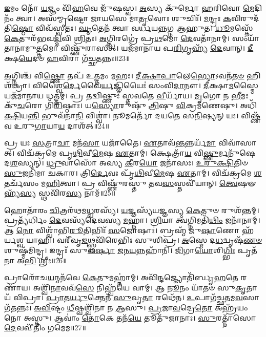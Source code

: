 \-\ul{𑌇}\-𑌮𑌂 𑌨𑍋᳴ \ul{𑌯}\-𑌜𑍍𑌞𑌂 𑌵𑌿᳴\-\ul{𑌹}\-𑌵𑍇 𑌜𑍁᳴𑌷𑌸𑍍𑌵।
\-\ul{𑌅}\-𑌸𑍍𑌯 𑌕𑍁᳴𑌰𑍍𑌮𑍋 𑌹𑌰𑌿𑌵𑍋 \ul{𑌮𑍇}\-𑌦𑌿𑌨𑌂᳴ 𑌤𑍍𑌵𑌾।
𑌅𑌸᳴𑌮𑍍𑌮𑍃𑌷𑍍𑌟𑍋 𑌜𑌾𑌯𑌸𑍇 𑌮𑌾\-\ul{𑌤𑍃}\-𑌵𑍋𑌃 𑌶𑍁𑌚𑌿𑌃᳴।
\-\ul{𑌮}\-𑌨𑍍𑌦𑍍𑌰𑌃 \ul{𑌕}\-𑌵𑌿𑌰𑍁𑌦᳴𑌤𑌿\-\ul{𑌷𑍍𑌠𑍋} 𑌵𑌿𑌵᳴𑌸𑍍𑌵𑌤𑌃।
\-\ul{𑌘𑍃}\-𑌤𑍇𑌨᳴ 𑌤𑍍𑌵𑌾 𑌵𑌰𑍍𑌧𑌯𑌨𑍍𑌨𑌗𑍍𑌨 𑌆𑌹𑍁𑌤।
\-\ul{𑌧𑍂}\-𑌮𑌸𑍍𑌤𑍇᳴ \ul{𑌕𑍇}\-𑌤𑍁𑌰᳴𑌭𑌵\-\ul{𑌦𑍍𑌦𑌿}\-𑌵𑌿 \ul{𑌶𑍍𑌰𑌿}\-𑌤𑌃।
\-\ul{𑌅}\-𑌗𑍍𑌨𑌿𑌰𑌗𑍍𑌰𑍇॑ 𑌪𑍍𑌰\-\ul{𑌥}\-𑌮𑍋 \ul{𑌦𑍇}\-𑌵𑌤𑌾᳴𑌨𑌾𑌮𑍍।
𑌸𑌂𑌯𑌾᳴𑌤𑌾𑌨𑌾𑌮𑍁\-\ul{𑌤𑍍𑌤}\-𑌮𑍋 𑌵𑌿𑌷𑍍𑌣𑍁᳴𑌰𑌾𑌸𑍀𑌤𑍍।
𑌯𑌜᳴𑌮𑌾𑌨𑌾𑌯 𑌪\-\ul{𑌰𑌿}\-𑌗𑍃𑌹𑍍𑌯᳴ \ul{𑌦𑍇}\-𑌵𑌾𑌨𑍍।
\-\ul{𑌦𑍀}\-𑌕𑍍𑌷\-\ul{𑌯𑍇}\-𑌦𑍞 \ul{𑌹}\-𑌵𑌿𑌰𑌾 𑌗᳴𑌚𑍍𑌛𑌤𑌨𑍍𑌨𑌃॥23॥

\-\ul{𑌅}\-𑌗𑍍𑌨𑌿𑌶𑍍𑌚᳴ 𑌵𑌿\-\ul{𑌷𑍍𑌣𑍋} 𑌤𑌪᳴ 𑌉\-\ul{𑌤𑍍𑌤}\-𑌮𑌂 \ul{𑌮}\-𑌹𑌃।
\-\ul{𑌦𑍀}\-\-\ul{𑌕𑍍𑌷𑌾}\-\-\ul{𑌪𑌾}\-𑌲𑍇\-\ul{𑌭𑍍𑌯𑍋}\-\-𑌽𑌵𑌨᳴\-\ul{𑌤}\-\-\ul{𑍞} 𑌹𑌿 𑌶᳴𑌕𑍍𑌰𑌾।
𑌵𑌿𑌶𑍍𑌵𑍈॑\-\ul{𑌰𑍍𑌦𑍇}\-𑌵𑍈\-\ul{𑌰𑍍𑌯}\-𑌜𑍍𑌞𑌿𑌯𑍈𑌃॑ 𑌸𑌂𑌵𑌿\-\ul{𑌦𑌾}\-𑌨𑍗।
\-\ul{𑌦𑍀}\-𑌕𑍍𑌷𑌾\-\ul{𑌮}\-𑌸𑍍𑌮𑍈 𑌯𑌜᳴𑌮𑌾𑌨𑌾𑌯 𑌧𑌤𑍍𑌤𑌮𑍍।
𑌪𑍍𑌰 𑌤𑌦𑍍𑌵𑌿𑌷𑍍𑌣𑍁𑌃᳴ 𑌸𑍍𑌤𑌵𑌤𑍇 \ul{𑌵𑍀}\-𑌰𑍍𑌯𑌾᳴𑌯।
\-\ul{𑌮𑍃}\-𑌗𑍋 𑌨 \ul{𑌭𑍀}\-𑌮𑌃 𑌕𑍁᳴\-\ul{𑌚}\-𑌰𑍋 𑌗𑌿᳴\-\ul{𑌰𑌿}\-𑌷𑍍𑌠𑌾𑌃।
𑌯\-\ul{𑌸𑍍𑌯𑍋}\-𑌰𑍁𑌷𑍁᳴ \ul{𑌤𑍍𑌰𑌿}\-𑌷𑍁 \ul{𑌵𑌿}\-𑌕𑍍𑌰𑌮᳴𑌣𑍇𑌷𑍁।
𑌅𑌧𑌿᳴ \ul{𑌕𑍍𑌷𑌿}\-𑌯\-\ul{𑌨𑍍𑌤𑌿} 𑌭𑍁𑌵᳴𑌨𑌾\-\ul{𑌨𑌿} 𑌵𑌿𑌶𑍍𑌵𑌾॑।
𑌨𑍂𑌮𑌰𑍍𑌤𑍋᳴ 𑌦𑌯𑌤𑍇 𑌸\-\ul{𑌨𑌿}\-𑌷𑍍𑌯𑌨𑍍 𑌯𑌃।
𑌵𑌿𑌷𑍍𑌣᳴𑌵 𑌉𑌰𑍁\-\ul{𑌗𑌾}\-𑌯𑌾\-\ul{𑌯} 𑌦𑌾𑌶᳴𑌤𑍍॥24॥

𑌪𑍍𑌰 𑌯𑌃 \ul{𑌸}\-𑌤𑍍𑌰𑌾\-\ul{𑌚𑌾} 𑌮𑌨᳴\-\ul{𑌸𑌾} 𑌯𑌜𑌾᳴𑌤𑍈।
\-\ul{𑌏}\-𑌤𑌾𑌵᳴\-\ul{𑌨𑍍𑌤}\-𑌨𑍍𑌨𑌰𑍍𑌯᳴\-\ul{𑌮𑌾} 𑌵𑌿𑌵𑌾᳴𑌸𑌾𑌤𑍍।
𑌵𑌿𑌚᳴𑌕𑍍𑌰𑌮𑍇 𑌪𑍃\-\ul{𑌥𑌿}\-𑌵𑍀\-\ul{𑌮𑍇}\-𑌷 \ul{𑌏}\-𑌤𑌾𑌮𑍍।
𑌕𑍍𑌷𑍇𑌤𑍍𑌰𑌾᳴\-\ul{𑌯} 𑌵𑌿\-\ul{𑌷𑍍𑌣𑍁}\-𑌰𑍍𑌮𑌨𑍁᳴𑌷𑍇 𑌦\-\ul{𑌶}\-𑌸𑍍𑌯𑌨𑍍।
\-\ul{𑌧𑍍𑌰𑍁}\-𑌵𑌾𑌸𑍋᳴ 𑌅𑌸𑍍𑌯 \ul{𑌕𑍀}\-𑌰\-\ul{𑌯𑍋} 𑌜𑌨𑌾᳴𑌸𑌃।
\-\ul{𑌉}\-\-\ul{𑌰𑍁}\-\-\ul{𑌕𑍍𑌷𑌿}\-𑌤𑌿𑍞 \ul{𑌸𑍁}\-𑌜𑌨𑌿᳴𑌮𑌾 𑌚𑌕𑌾𑌰।
𑌤𑍍𑌰𑌿\-\ul{𑌰𑍍𑌦𑍇}\-𑌵𑌃 𑌪𑍃᳴\-\ul{𑌥𑌿}\-𑌵𑍀\-\ul{𑌮𑍇}\-𑌷 \ul{𑌏}\-𑌤𑌾𑌮𑍍।
𑌵𑌿𑌚᳴𑌕𑍍𑌰𑌮𑍇 \ul{𑌶}\-𑌤𑌰𑍍𑌚᳴𑌸𑌂 𑌮\-\ul{𑌹𑌿}\-𑌤𑍍𑌵𑌾।
𑌪𑍍𑌰 𑌵𑌿𑌷𑍍𑌣𑍁᳴𑌰𑌸𑍍𑌤𑍁 \ul{𑌤}\-𑌵\-\ul{𑌸}\-𑌸𑍍𑌤𑌵𑍀᳴𑌯𑌾𑌨𑍍।
\-\ul{𑌤𑍍𑌵𑍇}\-𑌷𑍟 𑌹𑍍𑌯᳴\-\ul{𑌸𑍍𑌯} 𑌸𑍍𑌥𑌵𑌿᳴𑌰\-\ul{𑌸𑍍𑌯} 𑌨𑌾𑌮᳴॥25॥

𑌹𑍋𑌤𑌾᳴𑌰𑌂 \ul{𑌚𑌿}\-𑌤𑍍𑌰𑌰᳴𑌥𑌮\-\ul{𑌧𑍍𑌵}\-𑌰𑌸𑍍𑌯᳴।
\-\ul{𑌯}\-𑌜𑍍𑌞𑌸𑍍𑌯᳴𑌯𑌜𑍍𑌞𑌸𑍍𑌯 \ul{𑌕𑍇}\-𑌤𑍁𑍞 𑌰𑍁𑌶᳴𑌨𑍍𑌤𑌮𑍍।
𑌪𑍍𑌰𑌤𑍍𑌯᳴𑌰𑍍𑌧𑌿𑌂 \ul{𑌦𑍇}\-𑌵𑌸𑍍𑌯᳴𑌦𑍇𑌵𑌸𑍍𑌯 \ul{𑌮}\-𑌹𑍍𑌨𑌾।
\-\ul{𑌶𑍍𑌰𑌿}\-𑌯𑌾 𑌤𑍍𑌵᳴𑌗𑍍𑌨𑌿𑌮𑌤𑌿᳴\-\ul{𑌥𑌿𑌂} 𑌜𑌨𑌾᳴𑌨𑌾𑌮𑍍।
𑌆 \ul{𑌨𑍋} 𑌵𑌿𑌶𑍍𑌵𑌾᳴𑌭𑌿\-\ul{𑌰𑍂}\-𑌤𑌿𑌭𑌿𑌃᳴ \ul{𑌸}\-𑌜𑍋𑌷𑌾𑌃॑।
𑌬𑍍𑌰𑌹𑍍𑌮᳴ 𑌜𑍁\-\ul{𑌷𑌾}\-𑌣𑍋 𑌹᳴𑌰𑍍𑌯𑌶𑍍𑌵 𑌯𑌾𑌹𑌿।
𑌵𑌰𑍀᳴𑌵𑍃\-\ul{𑌜}\-𑌥𑍍𑌸𑍍𑌥𑌵𑌿᳴𑌰𑍇𑌭𑌿𑌃 𑌸𑍁𑌶𑌿𑌪𑍍𑌰।
\-\ul{𑌅}\-𑌸𑍍𑌮𑍇 𑌦\-\ul{𑌧}\-𑌦𑍍𑌵𑍃𑌷᳴\-\ul{𑌣}\-\-\ul{𑍞} 𑌶𑍁𑌷𑍍𑌮᳴𑌮𑌿𑌨𑍍𑌦𑍍𑌰।
𑌇𑌨𑍍𑌦𑍍𑌰𑌃᳴ 𑌸𑍁\-\ul{𑌵}\-\-\ul{𑌰𑍍}\-𑌷𑌾 \ul{𑌜}\-𑌨\-\ul{𑌯}\-𑌨𑍍𑌨𑌹𑌾᳴𑌨𑌿।
\-\ul{𑌜𑌿}\-𑌗𑌾\-\ul{𑌯𑍋}\-𑌶𑌿\-\ul{𑌗𑍍𑌭𑌿𑌃} 𑌪𑍃𑌤᳴𑌨𑌾 𑌅\-\ul{𑌭𑌿} 𑌶𑍍𑌰𑍀𑌃॥26॥

𑌪𑍍𑌰𑌾𑌰𑍋᳴𑌚\-\ul{𑌯}\-𑌨𑍍𑌮𑌨᳴𑌵𑍇 \ul{𑌕𑍇}\-𑌤𑍁𑌮𑌹𑍍𑌨𑌾॑𑌮𑍍।
𑌅𑌵𑌿᳴\-\ul{𑌨𑍍𑌦}\-𑌜𑍍𑌜𑍍𑌯𑍋𑌤𑌿᳴𑌰𑍍𑌬𑍃\-\ul{𑌹}\-𑌤𑍇 𑌰𑌣𑌾᳴𑌯।
𑌅𑌶𑍍𑌵𑌿᳴\-\ul{𑌨𑌾}\-𑌵𑌵᳴\-\ul{𑌸𑍇} 𑌨𑌿𑌹𑍍𑌵᳴𑌯𑍇 𑌵𑌾𑌮𑍍।
𑌆 \ul{𑌨𑍂}\-𑌨𑌂 𑌯𑌾᳴𑌤𑍞 𑌸𑍁\-\ul{𑌕𑍃}\-𑌤𑌾𑌯᳴ 𑌵𑌿𑌪𑍍𑌰𑌾।
\-\ul{𑌪𑍍𑌰𑌾}\-\-\ul{𑌤}\-\-\ul{𑌰𑍍𑌯𑍁}\-𑌕𑍍𑌤𑍇𑌨᳴ \ul{𑌸𑍁}\-𑌵𑍃\-\ul{𑌤𑌾} 𑌰𑌥𑍇᳴𑌨।
\-\ul{𑌉}\-𑌪𑌾𑌗᳴𑌚𑍍𑌛\-\ul{𑌤}\-𑌮\-\ul{𑌵}\-𑌸𑌾𑌗᳴𑌤𑌨𑍍𑌨𑌃।
\-\ul{𑌅}\-\-\ul{𑌵𑌿}\-𑌷𑍍𑌟𑌂 \ul{𑌧𑍀}\-𑌷𑍍𑌵𑌶𑍍𑌵𑌿᳴𑌨𑌾 𑌨 \ul{𑌆}\-𑌸𑍁।
\-\ul{𑌪𑍍𑌰}\-𑌜𑌾\-\ul{𑌵}\-𑌦𑍍𑌰𑍇\-\ul{𑌤𑍋} 𑌅𑌹𑍍𑌰᳴𑌯𑌂 𑌨𑍋 𑌅𑌸𑍍𑌤𑍁।
𑌆𑌵𑌾𑌂॑ \ul{𑌤𑍋}\-𑌕𑍇 𑌤𑌨᳴\-\ul{𑌯𑍇} 𑌤𑍂𑌤𑍁᳴𑌜𑌾𑌨𑌾𑌃।
\-\ul{𑌸𑍁}\-𑌰𑌤𑍍𑌨𑌾᳴𑌸𑍋 \ul{𑌦𑍇}\-𑌵𑌵𑍀᳴𑌤𑌿𑌂 𑌗𑌮𑍇𑌮॥27॥


